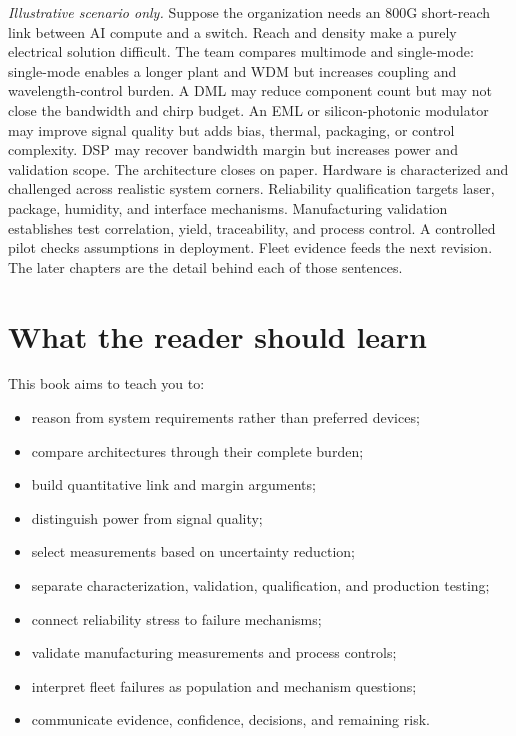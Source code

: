\textit{Illustrative scenario only.} Suppose the organization needs an 800G
short-reach link between AI compute and a switch. Reach and density make a
purely electrical solution difficult. The team compares multimode and
single-mode: single-mode enables a longer plant and WDM but increases coupling
and wavelength-control burden. A DML may reduce component count but may not
close the bandwidth and chirp budget. An EML or silicon-photonic modulator may
improve signal quality but adds bias, thermal, packaging, or control complexity.
DSP may recover bandwidth margin but increases power and validation scope. The
architecture closes on paper. Hardware is characterized and challenged across
realistic system corners. Reliability qualification targets laser, package,
humidity, and interface mechanisms. Manufacturing validation establishes test
correlation, yield, traceability, and process control. A controlled pilot checks
assumptions in deployment. Fleet evidence feeds the next revision. The later
chapters are the detail behind each of those sentences.

\section{What the reader should learn}

This book aims to teach you to:

\begin{itemize}
\item reason from system requirements rather than preferred devices;
\item compare architectures through their complete burden;
\item build quantitative link and margin arguments;
\item distinguish power from signal quality;
\item select measurements based on uncertainty reduction;
\item separate characterization, validation, qualification, and production
      testing;
\item connect reliability stress to failure mechanisms;
\item validate manufacturing measurements and process controls;
\item interpret fleet failures as population and mechanism questions;
\item communicate evidence, confidence, decisions, and remaining risk.
\end{itemize}

